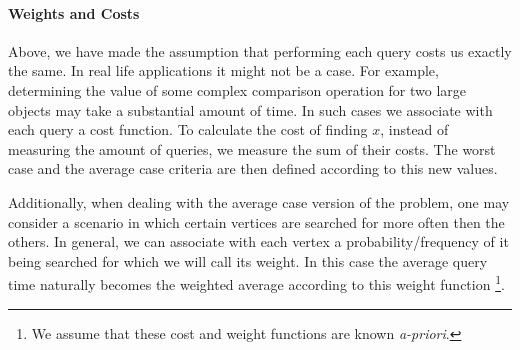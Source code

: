 \paragraph{Weights and Costs}
Above, we have made the assumption that performing each query costs us exactly the same. In real life applications it might not be a case. For example, determining the value of some complex comparison operation for two large objects may take a substantial amount of time. In such cases we associate with each query a cost function. To calculate the cost of finding $x$, instead of measuring the amount of queries, we measure the sum of their costs. The worst case and the average case criteria are then defined according to this new values. 

Additionally, when dealing with the average case version of the problem, one may consider a scenario in which certain vertices are searched for more often then the others. In general, we can associate with each vertex a probability/frequency of it being searched for which we will call its weight. In this case the average query time naturally becomes the weighted average according to this weight function \footnote{We assume that these cost and weight functions are known \textit{a-priori}.}.
